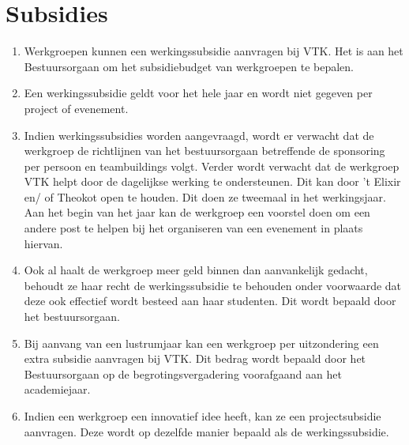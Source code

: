 \section{Subsidies}
\begin{enumerate}
    \item Werkgroepen kunnen een werkingssubsidie aanvragen bij VTK. Het is aan het Bestuursorgaan om het subsidiebudget van werkgroepen te bepalen.
    \item Een werkingssubsidie geldt voor het hele jaar en wordt niet gegeven per project of evenement.
    \item Indien werkingssubsidies worden aangevraagd, wordt er verwacht dat de werkgroep de richtlijnen van het bestuursorgaan betreffende de sponsoring per persoon en teambuildings volgt. Verder wordt verwacht dat de werkgroep VTK helpt door de dagelijkse werking te ondersteunen. Dit kan door 't Elixir en/ of Theokot open te houden. Dit doen ze tweemaal in het werkingsjaar. Aan het begin van het jaar kan de werkgroep een voorstel doen om een andere post te helpen bij het organiseren van een evenement in plaats hiervan.
    \item Ook al haalt de werkgroep meer geld binnen dan aanvankelijk gedacht, behoudt ze haar recht de werkingssubsidie te behouden onder voorwaarde dat deze ook effectief wordt besteed aan haar studenten. Dit wordt bepaald door het bestuursorgaan.
    \item Bij aanvang van een lustrumjaar kan een werkgroep per uitzondering een extra subsidie aanvragen bij VTK. Dit bedrag wordt bepaald door het Bestuursorgaan op de begrotingsvergadering voorafgaand aan het academiejaar.
    \item Indien een werkgroep een innovatief idee heeft, kan ze een projectsubsidie aanvragen. Deze wordt op dezelfde manier bepaald als de werkingssubsidie.
\end{enumerate}

